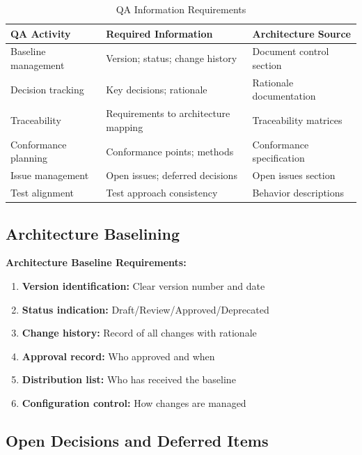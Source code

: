 \documentclass[11pt]{article}
\begin{document}
\begin{longtable}{@{}L{3.5cm} L{4cm} L{5cm}@{}}
\caption{QA Information Requirements} \\
\toprule
\textbf{QA Activity} & \textbf{Required Information} & \textbf{Architecture Source} \\
\midrule
\endfirsthead
\bottomrule
\endlastfoot
Baseline management & Version; status; change history & Document control section \\
Decision tracking & Key decisions; rationale & Rationale documentation \\
Traceability & Requirements to architecture mapping & Traceability matrices \\
Conformance planning & Conformance points; methods & Conformance specification \\
Issue management & Open issues; deferred decisions & Open issues section \\
Test alignment & Test approach consistency & Behavior descriptions \\
\end{longtable}

\subsection{Architecture Baselining}

\begin{bestpractice}
\textbf{Architecture Baseline Requirements:}

\begin{enumerate}
    \item \textbf{Version identification:} Clear version number and date
    \item \textbf{Status indication:} Draft/Review/Approved/Deprecated
    \item \textbf{Change history:} Record of all changes with rationale
    \item \textbf{Approval record:} Who approved and when
    \item \textbf{Distribution list:} Who has received the baseline
    \item \textbf{Configuration control:} How changes are managed
\end{enumerate}
\end{bestpractice}

\subsection{Open Decisions and Deferred Items}
\end{document}
